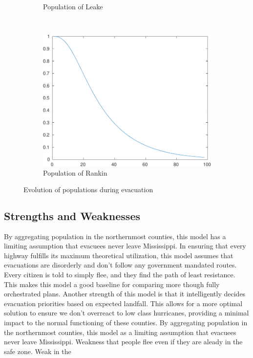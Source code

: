 \documentclass[titlepage]{article}
\begin{document}
\begin{figure}[H]
\begin{subfigure}[b]{0.3\textwidth}
        \caption{Population of Leake}
        \label{fig:pop_county39}
      \end{subfigure}~
      \begin{subfigure}[b]{0.3\textwidth}
        \center
        \includegraphics[width=\textwidth]{figures/pop_county_60-crop.pdf}
        \caption{Population of Rankin}
        \label{fig:pop_county60}
      \end{subfigure}
      \caption{Evolution of populations during evacuation}
      \label{fig:pop_deter}
    \end{figure}

  \subsection{Strengths and Weaknesses}
    By aggregating population in the northernmost counties, this model has a limiting assumption that evacuees never leave Mississippi.
    In ensuring that every highway fulfills its maximum theoretical utilization, this model assumes that evacuations are disorderly and don't follow any government mandated routes. Every citizen is told to simply flee, and they find the path of least resistance. This makes this model a good baseline for comparing more though fully orchestrated plans.
    Another strength of this model is that it intelligently decides evacuation priorities based on expected landfall. This allows for a more optimal solution to ensure we don't overreact to low class hurricanes, providing a minimal impact to the normal functioning of these counties.
    By aggregating population in the northernmost counties, this model as a limiting assumption that evacuees never leave Mississippi.
    Weakness that people flee even if they are aleady in the safe zone.
    Weak in the
\end{document}
